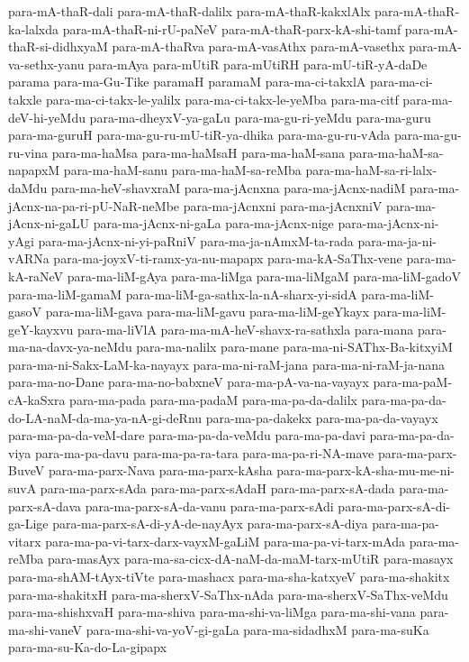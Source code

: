 {para-mA-thaR-dali
para-mA-thaR-dalilx
para-mA-thaR-kakxlAlx
para-mA-thaR-ka-lalxda
para-mA-thaR-ni-rU-paNeV
para-mA-thaR-parx-kA-shi-tamf
para-mA-thaR-si-didhxyaM
para-mA-thaRva
para-mA-vasAthx
para-mA-vasethx
para-mA-va-sethx-yanu
para-mAya
para-mUtiR
para-mUtiRH
para-mU-tiR-yA-daDe
parama
para-ma-Gu-Tike
paramaH
paramaM
para-ma-ci-takxlA
para-ma-ci-takxle
para-ma-ci-takx-le-yalilx
para-ma-ci-takx-le-yeMba
para-ma-citf
para-ma-deV-hi-yeMdu
para-ma-dheyxV-ya-gaLu
para-ma-gu-ri-yeMdu
para-ma-guru
para-ma-guruH
para-ma-gu-ru-mU-tiR-ya-dhika
para-ma-gu-ru-vAda
para-ma-gu-ru-vina
para-ma-haMsa
para-ma-haMsaH
para-ma-haM-sana
para-ma-haM-sa-napapxM
para-ma-haM-sanu
para-ma-haM-sa-reMba
para-ma-haM-sa-ri-lalx-daMdu
para-ma-heV-shavxraM
para-ma-jAcnxna
para-ma-jAcnx-nadiM
para-ma-jAcnx-na-pa-ri-pU-NaR-neMbe
para-ma-jAcnxni
para-ma-jAcnxniV
para-ma-jAcnx-ni-gaLU
para-ma-jAcnx-ni-gaLa
para-ma-jAcnx-nige
para-ma-jAcnx-ni-yAgi
para-ma-jAcnx-ni-yi-paRniV
para-ma-ja-nAmxM-ta-rada
para-ma-ja-ni-vARNa
para-ma-joyxV-ti-ramx-ya-nu-mapapx
para-ma-kA-SaThx-vene
para-ma-kA-raNeV
para-ma-liM-gAya
para-ma-liMga
para-ma-liMgaM
para-ma-liM-gadoV
para-ma-liM-gamaM
para-ma-liM-ga-sathx-la-nA-sharx-yi-sidA
para-ma-liM-gasoV
para-ma-liM-gava
para-ma-liM-gavu
para-ma-liM-geYkayx
para-ma-liM-geY-kayxvu
para-ma-liVlA
para-ma-mA-heV-shavx-ra-sathxla
para-mana
para-ma-na-davx-ya-neMdu
para-ma-nalilx
para-mane
para-ma-ni-SAThx-Ba-kitxyiM
para-ma-ni-Sakx-LaM-ka-nayayx
para-ma-ni-raM-jana
para-ma-ni-raM-ja-nana
para-ma-no-Dane
para-ma-no-babxneV
para-ma-pA-va-na-vayayx
para-ma-paM-cA-kaSxra
para-ma-pada
para-ma-padaM
para-ma-pa-da-dalilx
para-ma-pa-da-do-LA-naM-da-ma-ya-nA-gi-deRnu
para-ma-pa-dakekx
para-ma-pa-da-vayayx
para-ma-pa-da-veM-dare
para-ma-pa-da-veMdu
para-ma-pa-davi
para-ma-pa-da-viya
para-ma-pa-davu
para-ma-pa-ra-tara
para-ma-pa-ri-NA-mave
para-ma-parx-BuveV
para-ma-parx-Nava
para-ma-parx-kAsha
para-ma-parx-kA-sha-mu-me-ni-suvA
para-ma-parx-sAda
para-ma-parx-sAdaH
para-ma-parx-sA-dada
para-ma-parx-sA-dava
para-ma-parx-sA-da-vanu
para-ma-parx-sAdi
para-ma-parx-sA-di-ga-Lige
para-ma-parx-sA-di-yA-de-nayAyx
para-ma-parx-sA-diya
para-ma-pa-vitarx
para-ma-pa-vi-tarx-darx-vayxM-gaLiM
para-ma-pa-vi-tarx-mAda
para-ma-reMba
para-masAyx
para-ma-sa-cicx-dA-naM-da-maM-tarx-mUtiR
para-masayx
para-ma-shAM-tAyx-tiVte
para-mashacx
para-ma-sha-katxyeV
para-ma-shakitx
para-ma-shakitxH
para-ma-sherxV-SaThx-nAda
para-ma-sherxV-SaThx-veMdu
para-ma-shishxvaH
para-ma-shiva
para-ma-shi-va-liMga
para-ma-shi-vana
para-ma-shi-vaneV
para-ma-shi-va-yoV-gi-gaLa
para-ma-sidadhxM
para-ma-suKa
para-ma-su-Ka-do-La-gipapx
}
